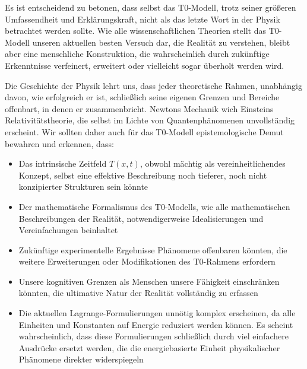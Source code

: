 \documentclass[12pt,a4paper]{article}
\newcommand{\Tfieldt}{T(x,t)}
\begin{document}
	Es ist entscheidend zu betonen, dass selbst das T0-Modell, trotz seiner größeren Umfassendheit und Erklärungskraft, nicht als das letzte Wort in der Physik betrachtet werden sollte. Wie alle wissenschaftlichen Theorien stellt das T0-Modell unseren aktuellen besten Versuch dar, die Realität zu verstehen, bleibt aber eine menschliche Konstruktion, die wahrscheinlich durch zukünftige Erkenntnisse verfeinert, erweitert oder vielleicht sogar überholt werden wird.
	
	Die Geschichte der Physik lehrt uns, dass jeder theoretische Rahmen, unabhängig davon, wie erfolgreich er ist, schließlich seine eigenen Grenzen und Bereiche offenbart, in denen er zusammenbricht. Newtons Mechanik wich Einsteins Relativitätstheorie, die selbst im Lichte von Quantenphänomenen unvollständig erscheint. Wir sollten daher auch für das T0-Modell epistemologische Demut bewahren und erkennen, dass:
	
	\begin{itemize}
		\item Das intrinsische Zeitfeld $\Tfieldt$, obwohl mächtig als vereinheitlichendes Konzept, selbst eine effektive Beschreibung noch tieferer, noch nicht konzipierter Strukturen sein könnte
		
		\item Der mathematische Formalismus des T0-Modells, wie alle mathematischen Beschreibungen der Realität, notwendigerweise Idealisierungen und Vereinfachungen beinhaltet
		
		\item Zukünftige experimentelle Ergebnisse Phänomene offenbaren könnten, die weitere Erweiterungen oder Modifikationen des T0-Rahmens erfordern
		
		\item Unsere kognitiven Grenzen als Menschen unsere Fähigkeit einschränken könnten, die ultimative Natur der Realität vollständig zu erfassen
		
		\item Die aktuellen Lagrange-Formulierungen unnötig komplex erscheinen, da alle Einheiten und Konstanten auf Energie reduziert werden können. Es scheint wahrscheinlich, dass diese Formulierungen schließlich durch viel einfachere Ausdrücke ersetzt werden, die die energiebasierte Einheit physikalischer Phänomene direkter widerspiegeln
	\end{itemize}
	
\end{document}
